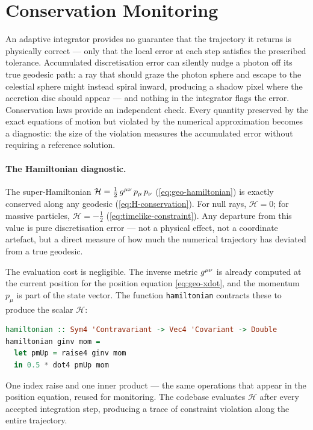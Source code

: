\section{Conservation Monitoring}
\label{sec:geo-conservation}

An adaptive integrator provides no guarantee that the trajectory it
returns is physically correct --- only that the local error at each step
satisfies the prescribed tolerance.  Accumulated discretisation error
can silently nudge a photon off its true geodesic path: a ray that
should graze the photon sphere and escape to the celestial sphere might
instead spiral inward, producing a shadow pixel where the accretion
disc should appear --- and nothing in the integrator flags the error.
Conservation laws provide an independent check.  Every quantity preserved by the exact equations
of motion but violated by the numerical approximation becomes a
diagnostic: the size of the violation measures the accumulated error
without requiring a reference solution.

\paragraph{The Hamiltonian diagnostic.}

The super-Hamiltonian $\mathcal{H} =
\tfrac{1}{2}\,g^{\mu\nu}\,p_\mu\,p_\nu$
(\cref{eq:geo-hamiltonian}) is exactly conserved along any geodesic
(\cref{eq:H-conservation}).  For null rays, $\mathcal{H} = 0$; for
massive particles, $\mathcal{H} = -\tfrac{1}{2}$
(\cref{eq:timelike-constraint}).  Any departure from this value is
pure discretisation error --- not a physical effect, not a coordinate
artefact, but a direct measure of how much the numerical trajectory
has deviated from a true geodesic.

The evaluation cost is negligible.  The inverse metric $g^{\mu\nu}$
is already computed at the current position for the position equation
\cref{eq:geo-xdot}, and the momentum $p_\mu$ is part of the state
vector.  The function \texttt{hamiltonian} contracts these to produce
the scalar $\mathcal{H}$:
%
\begin{lstlisting}[language=Haskell]
hamiltonian :: Sym4 'Contravariant -> Vec4 'Covariant -> Double
hamiltonian ginv mom =
  let pmUp = raise4 ginv mom
  in 0.5 * dot4 pmUp mom
\end{lstlisting}
%
One index raise and one inner product --- the same operations that
appear in the position equation, reused for monitoring.  The codebase
evaluates $\mathcal{H}$ after every accepted integration step, producing
a trace of constraint violation along the entire trajectory.

